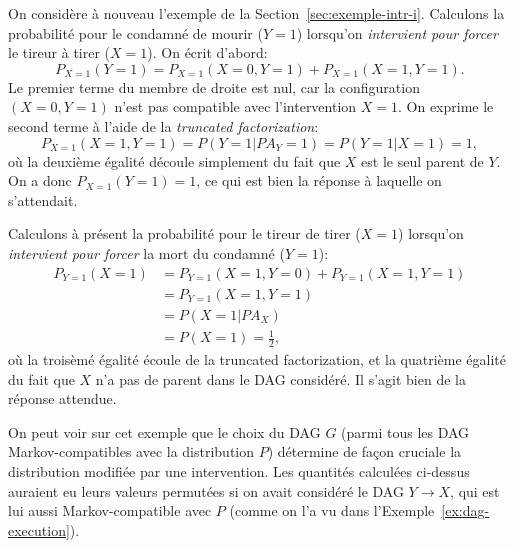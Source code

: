 \begin{example}[Exécution]
On considère à nouveau l'exemple de la Section~\ref{sec:exemple-intr-i}.
Calculons la probabilité pour le condamné de mourir ($Y=1$) lorsqu'on \emph{intervient pour forcer} le tireur à tirer ($X=1$). On écrit d'abord:
\[ P_{X=1}(Y=1)=P_{X=1}(X=0,Y=1)+P_{X=1}(X=1,Y=1). \]
Le premier terme du membre de droite est nul, car la configuration $(X=0,Y=1)$ n'est pas compatible avec l'intervention $X=1$. 
On exprime le second terme à l'aide de la \emph{truncated factorization}:
\[ P_{X=1}(X=1,Y=1)=P(Y=1|PA_Y=1)=P(Y=1|X=1)=1, \]
où la deuxième égalité découle simplement du fait que $X$ est le seul parent de $Y$.
On a donc $P_{X=1}(Y=1)=1$, ce qui est bien la réponse à laquelle on s'attendait.

Calculons à présent la probabilité pour le tireur de tirer ($X=1$) lorsqu'on \emph{intervient pour forcer} la mort du condamné ($Y=1$):
\begin{align*}
P_{Y=1}(X=1)&=P_{Y=1}(X=1,Y=0)+P_{Y=1}(X=1,Y=1)\\
&=P_{Y=1}(X=1,Y=1)\\
&=P(X=1|PA_X)\\
&=P(X=1)=\frac{1}{2},
\end{align*}
où la troisèmé égalité écoule de la truncated factorization, et la quatrième égalité du fait que $X$ n'a pas de parent dans le DAG considéré. Il s'agit bien de la réponse attendue.

On peut voir sur cet exemple que le choix du DAG $G$ (parmi tous les DAG Markov-compatibles avec la distribution $P$) 
détermine de façon cruciale la distribution modifiée par une intervention. Les quantités calculées ci-dessus auraient eu leurs valeurs permutées si on avait considéré le DAG $Y\to X$, qui est lui aussi Markov-compatible avec $P$ (comme on l'a vu dans l'Exemple~\ref{ex:dag-execution}). 
\end{example}

